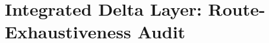 
\clearpage
\section*{Integrated Delta Layer: Route-Exhaustiveness Audit}
\providecommand{\HC}{}
\renewcommand{\HC}{\mathrm{HC}}
\providecommand{\MM}{}
\renewcommand{\MM}{\mathrm{MM}}
\providecommand{\OP}{}
\renewcommand{\OP}{\mathrm{OP}}
\providecommand{\adm}{}
\renewcommand{\adm}{\mathrm{adm}}
\providecommand{\near}{}
\renewcommand{\near}{\mathrm{near}}
\providecommand{\cert}{}
\renewcommand{\cert}{\mathrm{cert}}
\providecommand{\unr}{}
\renewcommand{\unr}{\mathrm{unr}}
\providecommand{\Dix}{}
\renewcommand{\Dix}{\mathrm{Dix}}
\providecommand{\HS}{}
\renewcommand{\HS}{\mathrm{HS}}
\providecommand{\Carrier}{}
\renewcommand{\Carrier}{\mathsf{Car}}
\providecommand{\Mask}{}
\renewcommand{\Mask}{\mathsf{Mask}}
\providecommand{\Code}{}
\renewcommand{\Code}{\mathsf{Code}}
\providecommand{\Gate}{}
\renewcommand{\Gate}{\mathsf{Gate}}
\providecommand{\Leak}{}
\renewcommand{\Leak}{\mathsf{Leak}}
\providecommand{\Debt}{}
\renewcommand{\Debt}{\mathsf{Debt}}
\providecommand{\Route}{}
\renewcommand{\Route}{\mathsf{Route}}
\providecommand{\Block}{}
\renewcommand{\Block}{\mathsf{block}}
\providecommand{\Abs}{}
\renewcommand{\Abs}{\mathsf{abs}}
\providecommand{\Res}{}
\renewcommand{\Res}{\mathsf{res}}
\providecommand{\Open}{}
\renewcommand{\Open}{\mathsf{open}}
\providecommand{\Ad}{}
\renewcommand{\Ad}{\mathsf{adm}}
\providecommand{\Image}{}
\renewcommand{\Image}{\operatorname{im}}
\providecommand{\supp}{}
\renewcommand{\supp}{\operatorname{supp}}
\providecommand{\rank}{}
\renewcommand{\rank}{\operatorname{rank}}
\providecommand{\Span}{}
\renewcommand{\Span}{\operatorname{span}}
\providecommand{\End}{}
\renewcommand{\End}{\operatorname{End}}
\providecommand{\C}{}
\renewcommand{\C}{\mathbb C}
\providecommand{\Hh}{}
\renewcommand{\Hh}{\mathbb H}
\providecommand{\Oo}{}
\renewcommand{\Oo}{\mathbb O}
\providecommand{\One}{}
\renewcommand{\One}{\mathbf 1}
\providecommand{\MC}{}
\renewcommand{\MC}{\mathcal M_{16}}
\providecommand{\PC}{}
\renewcommand{\PC}{\widehat P_{C_7}}
\providecommand{\Qp}{}
\renewcommand{\Qp}{Q_{\perp}}
\providecommand{\HDix}{}
\renewcommand{\HDix}{\mathcal H_{\Dix}}
\providecommand{\HsFour}{}
\renewcommand{\HsFour}{\mathcal H^{(4)}_{16}}
\providecommand{\HsFive}{}
\renewcommand{\HsFive}{\mathcal H^{(5)}_{32}}
